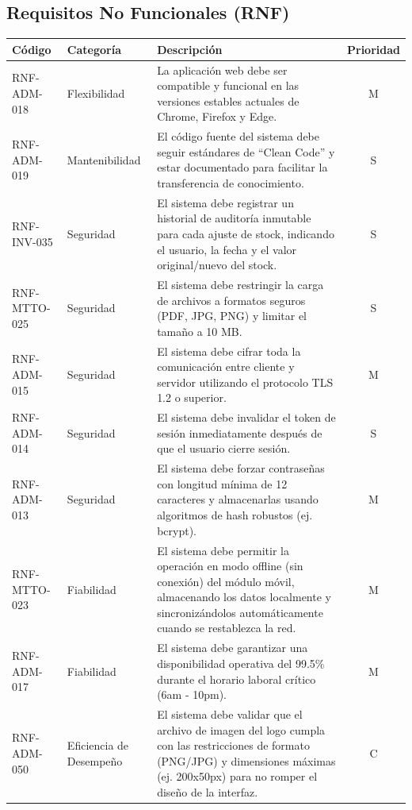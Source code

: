 \subsection{Requisitos No Funcionales (RNF)}
\footnotesize
\begin{longtable}{|p{2.5cm}|p{3.5cm}|p{7.5cm}|c|}
\hline
\textbf{Código} & \textbf{Categoría} & \textbf{Descripción} & \textbf{Prioridad} \\ \hline
\endhead
RNF-ADM-018 & Flexibilidad & La aplicación web debe ser compatible y funcional en las versiones estables actuales de Chrome, Firefox y Edge. & M \\ \hline
RNF-ADM-019 & Mantenibilidad & El código fuente del sistema debe seguir estándares de ``Clean Code'' y estar documentado para facilitar la transferencia de conocimiento. & S \\ \hline
RNF-INV-035 & Seguridad & El sistema debe registrar un historial de auditoría inmutable para cada ajuste de stock, indicando el usuario, la fecha y el valor original/nuevo del stock. & S \\ \hline
RNF-MTTO-025 & Seguridad & El sistema debe restringir la carga de archivos a formatos seguros (PDF, JPG, PNG) y limitar el tamaño a 10 MB. & S \\ \hline
RNF-ADM-015 & Seguridad & El sistema debe cifrar toda la comunicación entre cliente y servidor utilizando el protocolo TLS 1.2 o superior. & M \\ \hline
RNF-ADM-014 & Seguridad & El sistema debe invalidar el token de sesión inmediatamente después de que el usuario cierre sesión. & S \\ \hline
RNF-ADM-013 & Seguridad & El sistema debe forzar contraseñas con longitud mínima de 12 caracteres y almacenarlas usando algoritmos de hash robustos (ej. bcrypt). & M \\ \hline
RNF-MTTO-023 & Fiabilidad & El sistema debe permitir la operación en modo offline (sin conexión) del módulo móvil, almacenando los datos localmente y sincronizándolos automáticamente cuando se restablezca la red. & M \\ \hline
RNF-ADM-017 & Fiabilidad & El sistema debe garantizar una disponibilidad operativa del 99.5\% durante el horario laboral crítico (6am - 10pm). & M \\ \hline
RNF-ADM-050 & Eficiencia de Desempeño & El sistema debe validar que el archivo de imagen del logo cumpla con las restricciones de formato (PNG/JPG) y dimensiones máximas (ej. 200x50px) para no romper el diseño de la interfaz. & C \\ \hline

\end{longtable}
